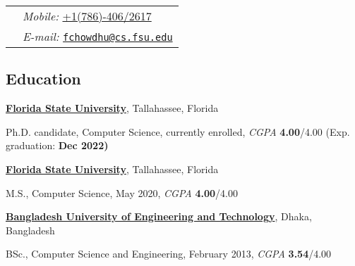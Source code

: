 \documentclass[margin,line]{res}
\newenvironment{list1}{
  \begin{list}{\ding{113}}{%
      \setlength{\itemsep}{0in}
      \setlength{\parsep}{0in} \setlength{\parskip}{0in}
      \setlength{\topsep}{0in} \setlength{\partopsep}{0in} 
      \setlength{\leftmargin}{0.17in}}}{\end{list}}
\begin{document}

\begin{tabular}{@{}p{2.5in}p{4in}}
\hspace{1cm} & \hspace{4cm} {\it Mobile:}  \href{tel:+17864062617}{+1(786)-406/2617} \\
\hspace{1cm} & \hspace{4cm} {\it E-mail:} \href{mailto:fchowdhu@cs.fsu.edu}{\nolinkurl{fchowdhu@cs.fsu.edu} } \\
\end{tabular}

\vspace*{-.2in}

\begin{resume}

\section{\sc Education}
{\bf \href{http://www.fsu.edu}{Florida State University}}, Tallahassee, Florida\\
\vspace*{-.15in}
\begin{list1}
\item[] Ph.D. candidate, Computer Science, currently enrolled, \textit{CGPA} \textbf{4.00}/4.00 (Exp. graduation: \bf{Dec 2022})
\end{list1}
\vspace*{-.15in}
{\bf \href{http://www.fsu.edu}{Florida State University}}, Tallahassee, Florida\\
\vspace*{-.15in}
\begin{list1}
\item[] M.S., Computer Science, May 2020, \textit{CGPA} \textbf{4.00}/4.00
\end{list1}
\vspace*{-.15in}
{\bf \href{http://buet.ac.bd}{Bangladesh University of Engineering and Technology}}, Dhaka, Bangladesh\\
\vspace*{-.15in}
\begin{list1}
\item[] BSc., Computer Science and Engineering, February 2013, \textit{CGPA} \textbf{3.54}/4.00
\end{list1}

\vspace*{-.05in}


\end{resume}
\end{document}
